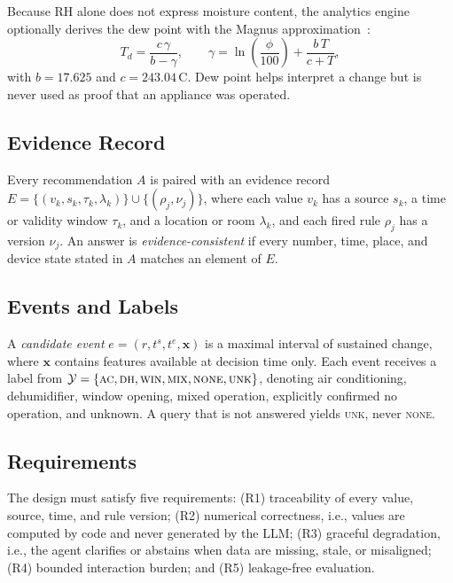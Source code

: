 \documentclass[conference]{IEEEtran}
\begin{document}
Because RH alone does not express moisture content, the analytics engine optionally derives the dew point with the Magnus approximation~\cite{lawrence2005dewpoint}:
\begin{equation}
T_d=\frac{c\,\gamma}{b-\gamma},\qquad
\gamma=\ln\!\left(\frac{\phi}{100}\right)+\frac{b\,T}{c+T},
\label{eq:dewpoint}
\end{equation}
with $b=17.625$ and $c=243.04$\,\textdegree C. Dew point helps interpret a change but is never used as proof that an appliance was operated.

\subsection{Evidence Record}
Every recommendation $A$ is paired with an evidence record
$E=\{(v_k, s_k, \tau_k, \lambda_k)\}\cup\{(\rho_j, \nu_j)\}$,
where each value $v_k$ has a source $s_k$, a time or validity window $\tau_k$, and a location or room $\lambda_k$, and each fired rule $\rho_j$ has a version $\nu_j$. An answer is \emph{evidence-consistent} if every number, time, place, and device state stated in $A$ matches an element of $E$.

\subsection{Events and Labels}
A \emph{candidate event} $e=(r, t^{s}, t^{e}, \mathbf{x})$ is a maximal interval of sustained change, where $\mathbf{x}$ contains features available at decision time only. Each event receives a label from
$\mathcal{Y}=\{\textsc{ac}, \textsc{dh}, \textsc{win}, \textsc{mix}, \textsc{none}, \textsc{unk}\}$,
denoting air conditioning, dehumidifier, window opening, mixed operation, explicitly confirmed no operation, and unknown. A query that is not answered yields \textsc{unk}, never \textsc{none}.

\subsection{Requirements}
The design must satisfy five requirements: (R1) traceability of every value, source, time, and rule version; (R2) numerical correctness, i.e., values are computed by code and never generated by the LLM; (R3) graceful degradation, i.e., the agent clarifies or abstains when data are missing, stale, or misaligned; (R4) bounded interaction burden; and (R5) leakage-free evaluation.

\end{document}
